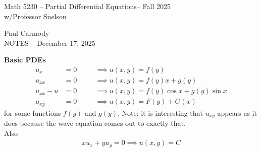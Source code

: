 \documentclass[12pt,a4paper]{report}
\newcommand{\CLASSNAME}{Math 5230 -- Partial Differential Equations}
\newcommand{\STUDENTNAME}{Paul Carmody}
\newcommand{\ASSIGNMENT}{NOTES }
\newcommand{\DUEDATE}{December 17, 2025}
\newcommand{\SEMESTER}{Fall 2025}
\begin{document}
\begin{center}
	\Large{\CLASSNAME -- \SEMESTER} \\
	\large{ w/Professor Snelson}
\end{center}
\begin{center}
	\STUDENTNAME \\
	\ASSIGNMENT -- \DUEDATE\\
\end{center} 

\textbf{\Large{Basic PDEs}}
\begin{align*}
	u_x  &= 0 & \quad &\implies u(x,y) = f(y) \\
	u_{xx} &= 0 & \quad &\implies u(x,y) = f(y)x+g(y) \\
	u_{xx}-u &=0 & \quad &\implies u(x,y) = f(y)\cos x + g(y)\sin x \\
	u_{xy} &= 0 & \quad &\implies u(x,y) = F(y) + G(x)
\end{align*}for some functions $f(y)$ and $g(y)$.  Note: it is interesting that $u_{xy}$ appears as it does because the wave equation comes out to exactly that.\\

Also
\begin{align*}
	xu_x+yu_y=0 \implies u(x,y) = C
\end{align*}
\end{document}
